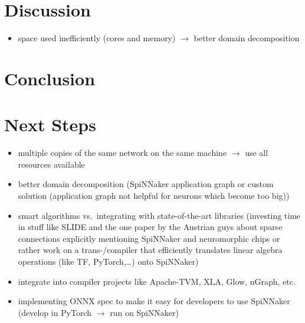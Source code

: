 \documentclass[]{article}
\begin{document}
\section{Discussion}
\label{sec:discussion}

\begin{itemize}
  \item space used inefficiently (cores and memory) $\rightarrow$ better
    domain decomposition
\end{itemize}

\section{Conclusion}
\label{sec:conclusion}

\section{Next Steps}
\label{sec:next_steps}

\begin{itemize}
  \item multiple copies of the same network on the same machine
    $\rightarrow$ use all resources available
  \item better domain decomposition (SpiNNaker application graph or
    custom solution (application graph not helpful for neurons which
    become too big))
  \item smart algorithms vs.\ integrating with state-of-the-art libraries
    (investing time in stuff like SLIDE and the one paper by the Austrian
    guys about sparse connections explicitly mentioning SpiNNaker and
    neuromorphic chips or rather work on a trans-/compiler
    that efficiently translates linear algebra operations (like TF,
    PyTorch,\dots) onto SpiNNaker)
  \item integrate into compiler projects like Apache-TVM, XLA, Glow,
   nGraph, etc.
  \item implementing ONNX spec to make it easy for developers to use
    SpiNNaker (develop in PyTorch $\rightarrow$ run on SpiNNaker)
\end{itemize}


\end{document}
